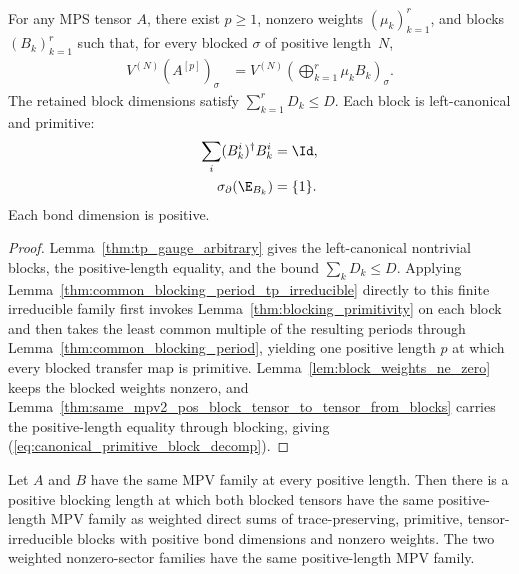 \begin{lemma}%
    \label{thm:tp_primitive_blockdecomp}
    \leanok
    For any MPS tensor $A$, there exist $p\ge1$, nonzero weights
    $(\mu_k)_{k=1}^r$, and blocks $(B_k)_{k=1}^r$ such that, for every blocked
    $\sigma$ of positive length~$N$,
    \begin{align}
        V^{(N)}(A^{[p]})_\sigma
         & =
        V^{(N)}\!\left(\bigoplus_{k=1}^{r}\mu_kB_k\right)_\sigma.
        \label{eq:canonical_primitive_block_decomp}
    \end{align}
    The retained block dimensions satisfy $\sum_{k=1}^{r}D_k\le D$. Each
    block is left-canonical and primitive:
    \begin{align}
        \sum_i(B_k^i)^\dagger B_k^i
         & =\Id,
        \notag     \\
        \sigma_\partial(\E_{B_k})
         & =\{1\}.
        \notag
    \end{align}
    Each bond dimension is positive.
\end{lemma}

\begin{proof}\leanok
    Lemma~\ref{thm:tp_gauge_arbitrary} gives the left-canonical nontrivial
    blocks, the positive-length equality, and the bound $\sum_kD_k\le D$.
    Applying Lemma~\ref{thm:common_blocking_period_tp_irreducible} directly to
    this finite irreducible family first invokes
    Lemma~\ref{thm:blocking_primitivity} on each block and then takes the
    least common multiple of the resulting periods through
    Lemma~\ref{thm:common_blocking_period}, yielding one positive length
    $p$ at which every blocked transfer map is primitive.
    Lemma~\ref{lem:block_weights_ne_zero} keeps the blocked weights nonzero, and
    Lemma~\ref{thm:same_mpv2_pos_block_tensor_to_tensor_from_blocks} carries
    the positive-length equality through blocking, giving
    (\ref{eq:canonical_primitive_block_decomp}).
\end{proof}

\begin{lemma}%
    \label{thm:unconditional_common_primitive_irreducible_blocks}
    \leanok
    Let $A$ and $B$ have the same MPV family at every positive length. Then
    there is a positive blocking length at which both blocked tensors have the
    same positive-length MPV family as weighted direct sums of
    trace-preserving, primitive, tensor-irreducible blocks with positive bond
    dimensions and nonzero weights. The two weighted nonzero-sector families
    have the same positive-length MPV family.
\end{lemma}

